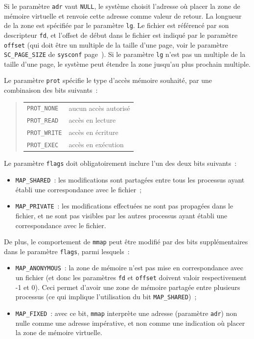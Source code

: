 \documentclass [twoside] {report}
\begin{document}
Si le paramètre \texttt {adr} vaut \texttt {NULL}, le système choisit
l'adresse où placer la zone de mémoire virtuelle et renvoie cette
adresse comme valeur de retour. La longueur de la zone est spécifiée
par le paramètre \texttt {lg}. Le fichier est référencé par son
descripteur \texttt {fd}, et l'offset de début dans le fichier est
indiqué par le paramètre \texttt {offset} (qui doit être un multiple
de la taille d'une page, voir le paramètre \texttt {SC\_PAGE\_SIZE}
de \texttt {sysconf} page~\pageref {sysconf}). Si le paramètre \texttt {lg}
n'est pas un multiple de la taille d'une page, le système peut étendre
la zone jusqu'au plus prochain multiple.

Le paramètre \texttt {prot} spécifie le type d'accès mémoire
souhaité, par une combinaison des bits suivants~:

\begin {quote}
    \begin {tabular} {|ll|} \hline
	\texttt {PROT\_NONE} & aucun accès autorisé \\
	\texttt {PROT\_READ} & accès en lecture \\
	\texttt {PROT\_WRITE} & accès en écriture \\
	\texttt {PROT\_EXEC} & accès en exécution \\
	\hline
    \end {tabular}
\end {quote}

Le paramètre \texttt {flags} doit obligatoirement inclure l'un des deux
bits suivants~:

\begin {itemize}
    \item \texttt {MAP\_SHARED}~: les modifications sont partagées entre
	tous les processus ayant établi une correspondance avec le
	fichier~;
    \item \texttt {MAP\_PRIVATE}~: les modifications effectuées ne sont
	pas propagées dans le fichier, et ne sont pas visibles par les
	autres processus ayant établi une correspondance avec le fichier.

\end {itemize}

De plus, le comportement de \texttt {mmap} peut être modifié par des
bits supplémentaires dans le paramètre \texttt {flags}, parmi lesquels~:

\begin {itemize}
    \item \texttt {MAP\_ANONYMOUS}~: la zone de mémoire n'est pas mise
	en correspondance avec un fichier (et donc les paramètres
	\texttt {fd} et \texttt {offset} doivent valoir respectivement
	-1 et 0).  Ceci permet d'avoir une zone de mémoire partagée
	entre plusieurs processus (ce qui implique l'utilisation du bit
	\texttt {MAP\_SHARED})~;

    \item \texttt {MAP\_FIXED}~: avec ce bit, \texttt {mmap} interprète
	une adresse (paramètre \texttt {adr}) non nulle comme une
	adresse impérative, et non comme une indication où placer la
	zone de mémoire virtuelle.

\end {itemize}
\end{document}
